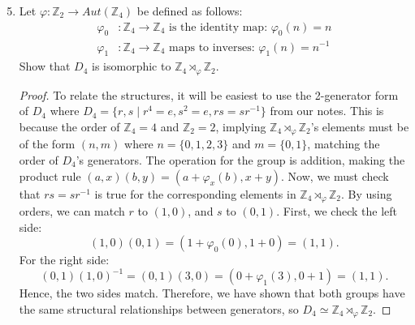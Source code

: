 \documentclass[12pt, oneside]{book}
\newcommand{\Z}{\mathbb{Z}}
\newcommand{\pf}[1]{
    \begin{customframedproof}[linecolor=orangehdx!75]
        \begin{proof}
        #1
        \end{proof}
    \end{customframedproof}
}
\begin{document}
\begin{enumerate}
    \setcounter{enumi}{4}
    \item Let \(\varphi : \Z_{2} \to Aut(\Z_{4})\) be defined as follows:
    \begin{align*}
        \varphi_{0} & : \Z_{4} \to \Z_{4} \text{ is the identity map: } \varphi_{0}(n) = n \\
        \varphi_{1} & : \Z_{4} \to \Z_{4} \text{ maps to inverses: } \varphi_{1}(n) = n^{-1} 
    \end{align*}
    Show that \(D_{4}\) is isomorphic to \(\Z_{4} \rtimes_{\varphi} \Z_{2}\). 
    \pf{
        To relate the structures, it will be easiest to use the 2-generator form of \(D_{4}\) where \(D_{4} = \{r,s \mid r^{4} = e, s^{2} = e, rs = sr^{-1}\}\) from our notes. This is because the order of \(\Z_{4} = 4\) and \(\Z_{2} = 2\), implying \(\Z_{4} \rtimes_{\varphi} \Z_{2}\)'s elements must be of the form \((n,m)\) where \(n = \{0,1,2,3\}\) and \(m = \{0,1\}\), matching the order of \(D_{4}\)'s generators. The operation for the group is addition, making the product rule \((a,x)(b,y) = (a + \varphi_{x}(b), x+ y)\). Now, we must check that \(rs = sr^{-1}\) is true for the corresponding elements in \(\Z_{4} \rtimes_{\varphi} \Z_{2}\). By using orders, we can match \(r\) to \((1,0)\), and \(s\) to \((0,1)\). First, we check the left side:
        \[
            (1,0)(0,1) = (1 + \varphi_{0}(0), 1 + 0) = (1, 1).
        \]
        For the right side:
        \[
            (0,1)(1,0)^{-1} = (0,1)(3,0) = (0 + \varphi_{1}(3), 0 + 1) = (1,1).
        \]
        Hence, the two sides match. Therefore, we have shown that both groups have the same structural relationships between generators, so \(D_{4} \simeq \Z_{4} \rtimes_{\varphi} \Z_{2}\).
    }
\end{enumerate}
\end{document}
